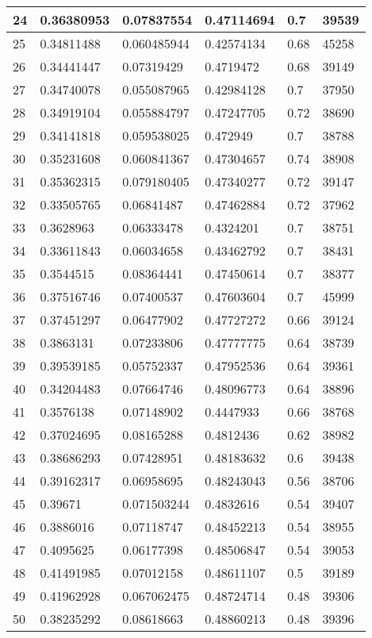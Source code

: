\begin{longtable}{|l|l|l|l|l|l|}
24 & 0.36380953 & 0.07837554 & 0.47114694 & 0.7 & 39539 \\ \hline 
25 & 0.34811488 & 0.060485944 & 0.42574134 & 0.68 & 45258 \\ \hline 
26 & 0.34441447 & 0.07319429 & 0.4719472 & 0.68 & 39149 \\ \hline 
27 & 0.34740078 & 0.055087965 & 0.42984128 & 0.7 & 37950 \\ \hline 
28 & 0.34919104 & 0.055884797 & 0.47247705 & 0.72 & 38690 \\ \hline 
29 & 0.34141818 & 0.059538025 & 0.472949 & 0.7 & 38788 \\ \hline 
30 & 0.35231608 & 0.060841367 & 0.47304657 & 0.74 & 38908 \\ \hline 
31 & 0.35362315 & 0.079180405 & 0.47340277 & 0.72 & 39147 \\ \hline 
32 & 0.33505765 & 0.06841487 & 0.47462884 & 0.72 & 37962 \\ \hline 
33 & 0.3628963 & 0.06333478 & 0.4324201 & 0.7 & 38751 \\ \hline 
34 & 0.33611843 & 0.06034658 & 0.43462792 & 0.7 & 38431 \\ \hline 
35 & 0.3544515 & 0.08364441 & 0.47450614 & 0.7 & 38377 \\ \hline 
36 & 0.37516746 & 0.07400537 & 0.47603604 & 0.7 & 45999 \\ \hline 
37 & 0.37451297 & 0.06477902 & 0.47727272 & 0.66 & 39124 \\ \hline 
38 & 0.3863131 & 0.07233806 & 0.47777775 & 0.64 & 38739 \\ \hline 
39 & 0.39539185 & 0.05752337 & 0.47952536 & 0.64 & 39361 \\ \hline 
40 & 0.34204483 & 0.07664746 & 0.48096773 & 0.64 & 38896 \\ \hline 
41 & 0.3576138 & 0.07148902 & 0.4447933 & 0.66 & 38768 \\ \hline 
42 & 0.37024695 & 0.08165288 & 0.4812436 & 0.62 & 38982 \\ \hline 
43 & 0.38686293 & 0.07428951 & 0.48183632 & 0.6 & 39438 \\ \hline 
44 & 0.39162317 & 0.06958695 & 0.48243043 & 0.56 & 38706 \\ \hline 
45 & 0.39671 & 0.071503244 & 0.4832616 & 0.54 & 39407 \\ \hline 
46 & 0.3886016 & 0.07118747 & 0.48452213 & 0.54 & 38955 \\ \hline 
47 & 0.4095625 & 0.06177398 & 0.48506847 & 0.54 & 39053 \\ \hline 
48 & 0.41491985 & 0.07012158 & 0.48611107 & 0.5 & 39189 \\ \hline 
49 & 0.41962928 & 0.067062475 & 0.48724714 & 0.48 & 39306 \\ \hline 
50 & 0.38235292 & 0.08618663 & 0.48860213 & 0.48 & 39396 \\ \hline 
\end{longtable}